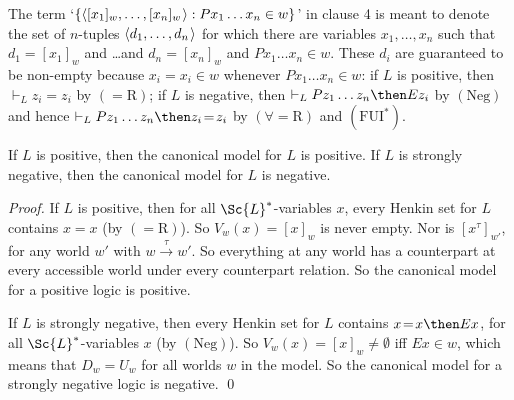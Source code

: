 \documentclass[11pt]{woarticle}
\newcommand{\cmnt}[1]{\iffalse #1 \fi}
\theoremstyle{break}
\theoremstyle{nonumberplain}
\newcommand{\SAT}{\Vdash}
\newcommand{\1}{\;\,|\;\,}
\renewcommand{\t}[1]{\ensuremath{\langle #1  \makebox[.2ex]{}\rangle}}
\newcommand{\T}[1]{\ensuremath{(\mathrm{ #1})}}
\begin{document}
\cmnt{

  (Note that even if $[x]_w$ at $w$ has no counterpart at $w'$, $w',V'
  \SAT Fx$ iff $Fx^\tau \in w'$. So in our canonical model, $x^\tau$
  still represents $x$, despite the fact that $V'(x) = undef \not=
  [x^\tau]_{w'}$. We could alternatively change the definition of
  $\tau$ so that $x^\tau$ can be undefined, but this complicates
  things a lot.)

}

\cmnt{

  Here we will need the strongly negative axioms \T{NA} and
  \T{TE}. \T{NA} says that $\neg Ex \then \Box \neg Ex$. This means
  that if $\neg Ex\in w$, then $\neg Ex^\tau \in w'$ for all $wRw'$,
  which guarantees that non-existent objects don't have
  counterparts. \T{TE} guarantee that individuals do not go partly out
  of existence: $x\!=\!y \then \Box (Ex \then Ey)$. So if $x\!=\!y \in
  w$ and $x^\tau\!\not=\!x^\tau \in w'$, then $y^\tau\!\not=\!y^\tau
  \in w'$.

}

The term `$\{ \t{[x_1]_w,\ldots, [x_n]_w} : P x_1\ldots x_n \in w \}$' in clause
4 is meant to denote the set of $n$-tuples $\t{d_1,\ldots,d_n}$ for which there
are variables $x_1,\ldots,x_n$ such that $d_1 = [x_1]_w$ and \ldots and
$d_n = [x_n]_w$ and $Px_1\ldots x_n \in w$. These $d_i$ are guaranteed to be
non-empty because $x_i\!=\!x_i \in w$ whenever $Px_1\ldots x_n \in w$: if $L$ is
positive, then $\vdash_L z_i\!=\!z_i$ by \T{=\!R}; if $L$ is negative, then
$\vdash_L Pz_1\ldots z_n \then Ez_i$ by \T{Neg} and hence
$\vdash_L Pz_1\ldots z_n \then z_i\!=\!z_i$ by \T{\forall\!=\!R} and
\T{FUI^*}.\label{notenonempty}



\begin{lemma}\label{cmfit} 
  If $L$ is positive, then the canonical model for $L$ is positive. If
  $L$ is strongly negative, then the canonical model for $L$ is
  negative.
\end{lemma}
\begin{proof}
  If $L$ is positive, then for all $\Sc{L}^*$-variables $x$, every
  Henkin set for $L$ contains $x\!=\!x$ (by \T{=\!R}). So $V_w(x) =
  [x]_w$ is never empty. Nor is $[x^\tau]_{w'}$, for any world $w'$
  with $w\xrightarrow{\tau}w'$. So everything at any world has a
  counterpart at every accessible world under every counterpart
  relation. So the canonical model for a positive logic is positive.

  If $L$ is strongly negative, then every Henkin set for $L$ contains
  $x\!=\!x \then Ex$, for all $\Sc{L}^*$-variables $x$ (by
  \T{Neg}). So $V_w(x) = [x]_w \not= \emptyset$ iff $Ex \in w$, which
  means that $D_w = U_w$ for all worlds $w$ in the model. So the
  canonical model for a strongly negative logic is negative. \qed
\end{proof}
\end{document}
